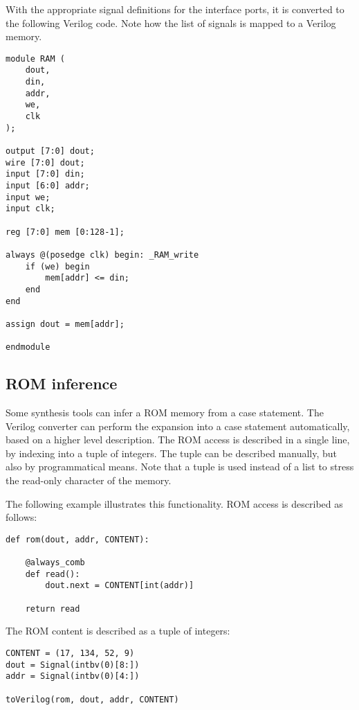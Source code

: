 With the appropriate signal definitions for the interface ports, it is
converted to the following Verilog code. Note how the
list of signals  is mapped to a Verilog memory.

\begin{verbatim}
module RAM (
    dout,
    din,
    addr,
    we,
    clk
);

output [7:0] dout;
wire [7:0] dout;
input [7:0] din;
input [6:0] addr;
input we;
input clk;

reg [7:0] mem [0:128-1];

always @(posedge clk) begin: _RAM_write
    if (we) begin
        mem[addr] <= din;
    end
end

assign dout = mem[addr];

endmodule
\end{verbatim}


\subsection{ROM inference \label{conf-usage-ROM}}
Some synthesis tools can infer a ROM memory from a case statement. The
Verilog converter can perform the expansion into a case statement
automatically, based on a higher level description. The ROM access is
described in a single line, by indexing into a tuple of integers. The
tuple can be described manually, but also by programmatical
means. Note that a tuple is used instead of a list to stress the
read-only character of the memory.

The following example illustrates this functionality. ROM access
is described as follows:

\begin{verbatim}
def rom(dout, addr, CONTENT):
                                                                                
    @always_comb
    def read():
        dout.next = CONTENT[int(addr)]
                                                                                
    return read
\end{verbatim}

The ROM content is described as a tuple of integers:

\begin{verbatim}
CONTENT = (17, 134, 52, 9)
dout = Signal(intbv(0)[8:])
addr = Signal(intbv(0)[4:])
                                                                                
toVerilog(rom, dout, addr, CONTENT)
\end{verbatim}


